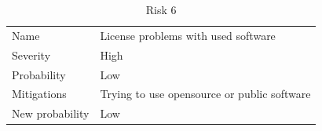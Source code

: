 \begin{table}
  \centering
  \caption{Risk 6}
  \begin{tabular}{ll}
    Name            & License problems with used software           \\
    Severity        & High                                 \\
    Probability     & Low                                   \\
    Mitigations     & Trying to use opensource or public software  \\
    New probability & Low                                   
  \end{tabular}
\end{table}
